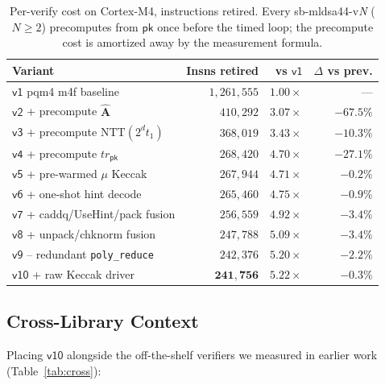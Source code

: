 \documentclass[11pt,a4paper]{article}
\newcommand{\NTT}{\mathrm{NTT}}
\begin{document}
\begin{table}[h]
\centering
\caption{Per-verify cost on Cortex-M4, instructions retired. Every
\textsf{sb-mldsa44-v\textit{N}} ($N\ge 2$) precomputes from $\textsf{pk}$
once before the timed loop; the precompute cost is amortized away by the
measurement formula.}
\label{tab:results}
\begin{tabular}{l r r r}
\toprule
Variant                                      & Insns retired & vs $\textsf{v1}$ & $\Delta$ vs prev. \\
\midrule
$\textsf{v1}$ pqm4 m4f baseline               & $1{,}261{,}555$ & $1.00\times$ & --- \\
$\textsf{v2}$ + precompute $\mathbf{\hat A}$  & $410{,}292$     & $3.07\times$ & $-67.5\%$ \\
$\textsf{v3}$ + precompute $\NTT(2^d t_1)$    & $368{,}019$     & $3.43\times$ & $-10.3\%$ \\
$\textsf{v4}$ + precompute $tr_{\textsf{pk}}$ & $268{,}420$     & $4.70\times$ & $-27.1\%$ \\
$\textsf{v5}$ + pre-warmed $\mu$ Keccak       & $267{,}944$     & $4.71\times$ & $-0.2\%$ \\
$\textsf{v6}$ + one-shot hint decode          & $265{,}460$     & $4.75\times$ & $-0.9\%$ \\
$\textsf{v7}$ + caddq/UseHint/pack fusion     & $256{,}559$     & $4.92\times$ & $-3.4\%$ \\
$\textsf{v8}$ + unpack/chknorm fusion         & $247{,}788$     & $5.09\times$ & $-3.4\%$ \\
$\textsf{v9}$ -- redundant \texttt{poly\_reduce} & $242{,}376$  & $5.20\times$ & $-2.2\%$ \\
$\textsf{v10}$ + raw Keccak driver            & $\mathbf{241{,}756}$ & $\mathbf{5.22\times}$ & $-0.3\%$ \\
\bottomrule
\end{tabular}
\end{table}

\subsection{Cross-Library Context}

Placing $\textsf{v10}$ alongside the off-the-shelf verifiers we measured
in earlier work (Table~\ref{tab:cross}):
\end{document}
